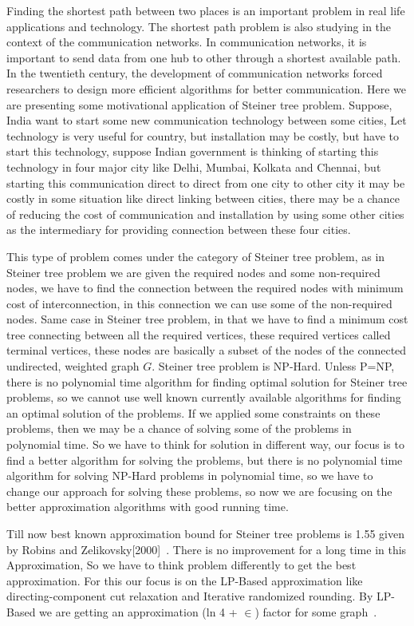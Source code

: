  Finding the shortest path between two places is an important problem in real life applications and technology. The shortest path problem is also studying in the context of the communication networks. In communication networks, it is important to send data from one hub to other through a shortest available path. In the twentieth century, the development of communication networks forced researchers to design more efficient algorithms for better communication. Here we are presenting some motivational application of Steiner tree problem. Suppose, India want to start some new communication technology between some cities, Let technology is very useful for country, but installation may be costly, but have to start this technology, suppose Indian government is thinking of starting this technology in four major city like Delhi, Mumbai, Kolkata and Chennai, but starting this communication direct to direct from one city to other city it may be costly in some situation like direct linking between cities, there may be a chance of reducing the cost of communication and installation by using some other cities as the intermediary for providing connection between these four cities.

 This type of problem comes under the category of Steiner tree problem, as in Steiner tree problem we are given the required nodes and some non-required nodes, we have to find the connection between the required nodes with minimum cost of interconnection, in this connection we can use some of the non-required nodes. Same case in Steiner tree problem, in that we have to find a minimum cost tree connecting between all the required vertices, these required vertices called terminal vertices, these nodes are basically a subset of the nodes of the connected undirected, weighted graph $G$. Steiner tree problem is NP-Hard. Unless P=NP, there is no polynomial time algorithm for finding optimal solution for Steiner tree problems, so we cannot use well known currently available algorithms for finding an optimal solution of the problems. If we applied some constraints on these problems, then we may be a chance of solving some of the problems in polynomial time. So we have to think for solution in different way, our focus is to find a better algorithm for solving the problems, but there is no polynomial time algorithm for solving NP-Hard problems in polynomial time, so we have to change our approach for solving these problems, so now we are focusing on the better approximation algorithms with good running time.

  Till now best known approximation bound for Steiner tree problems is 1.55 given by Robins and Zelikovsky[2000]~\cite{hougardy}. There is no improvement for a long time in this Approximation, So we have to think problem differently to get the best approximation. For this our focus is on the LP-Based approximation like directing-component cut relaxation and Iterative randomized rounding. By LP-Based we are getting an approximation (ln 4 + $\in$) factor for some graph~\cite{byrka}.

